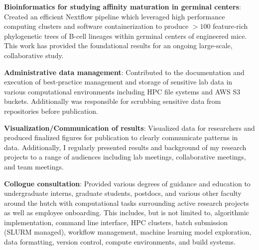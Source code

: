 \documentclass[letterpaper,9pt]{article}
\newcommand{\resumeItem}[2]{
  \begin{minipage}[t]{0.9\textwidth}
    \linespread{0.80}\selectfont
    \vspace{.1cm}\item\small{
      \textbf{#1}{: #2 \vspace{1pt}}
    }
  \end{minipage}
}
\begin{document}
                \resumeItem{Bioinformatics for studying affinity maturation in germinal centers}
                    {
                        Created an efficient Nextflow pipeline 
                        which leveraged high performance computing clusters and
                        software containerization to produce $>100$ feature-rich phylogenetic trees 
                        of B-cell lineages within germinal centers of engineered mice.
                        This work has provided the foundational results for an ongoing large-scale, 
                        collaborative study.
                    }
                \resumeItem{Administrative data management}
                    {
                        Contributed to the documentation and execution of best-practice
                        management and storage of sensitive lab data in various computational 
                        environments including HPC file systems and AWS S3 buckets.
                        Additionally was responsible for scrubbing sensitive data from
                        repositories before publication.
                    }
                \resumeItem{Visualization/Communication of results}
                    {
                        Visualized data for researchers and produced finalized figures for publication
                        to clearly communicate patterns in data.
                        Additionally, I regularly presented results and background of my research projects
                        to a range of audiences including lab meetings, collaborative meetings, and team meetings.
                    }
                \resumeItem{Collogue consultation}
                    {
                        Provided various degrees of guidance and education to 
                        undergraduate interns, graduate students, postdocs, and various other faculty around the hutch
                        with computational tasks surrounding active research projects as well as employee onboarding.
                        This includes, but is not limited to,
                        algorithmic implementation,
                        command line interface,
                        HPC clusters,
                        batch submission (SLURM managed),
                        workflow management,
                        machine learning model exploration,
                        data formatting,
                        version control, 
                        compute environments, 
                        and build systems.
                    }
\end{document}
